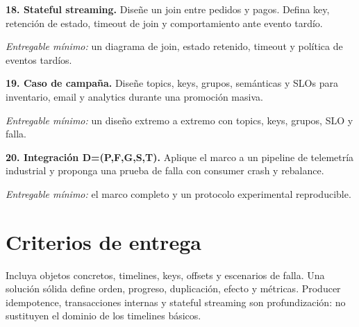 \documentclass[variant=guia,cover=institutional,mode=screen]{ua-engineering-v6-article}
\begin{document}
\begin{uaexercise}

\textbf{18. Stateful streaming.} Diseñe un join entre pedidos y pagos. Defina key, retención de estado, timeout de join y comportamiento ante evento tardío.

\textit{Entregable mínimo:} un diagrama de join, estado retenido, timeout y política de eventos tardíos.
\end{uaexercise}
\begin{uaexercise}

\textbf{19. Caso de campaña.} Diseñe topics, keys, grupos, semánticas y SLOs para inventario, email y analytics durante una promoción masiva.

\textit{Entregable mínimo:} un diseño extremo a extremo con topics, keys, grupos, SLO y falla.
\end{uaexercise}
\begin{uaexercise}

\textbf{20. Integración D=(P,F,G,S,T).} Aplique el marco a un pipeline de telemetría industrial y proponga una prueba de falla con consumer crash y rebalance.

\textit{Entregable mínimo:} el marco completo y un protocolo experimental reproducible.
\end{uaexercise}
\section{Criterios de entrega}
Incluya objetos concretos, timelines, keys, offsets y escenarios de falla. Una solución sólida define orden, progreso, duplicación, efecto y métricas. Producer idempotence, transacciones internas y stateful streaming son profundización: no sustituyen el dominio de los timelines básicos.
\end{document}
